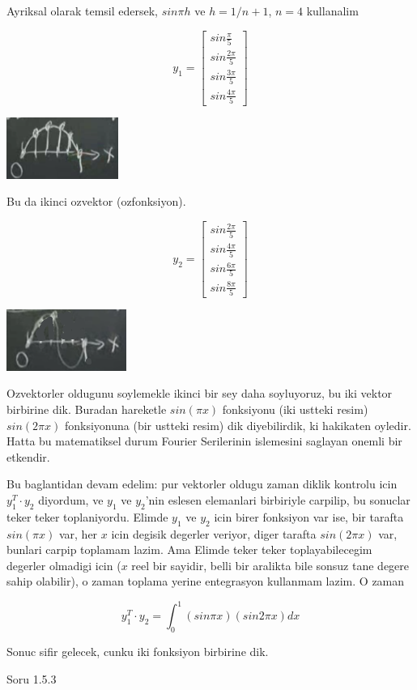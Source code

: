 \documentclass[12pt,fleqn]{article}\usepackage{../common}
\begin{document}
Ayriksal olarak temsil edersek, $sin\pi h$ ve $h = 1 / n+1$, $n = 4$
kullanalim

\[ 
y_1 = 
\left[\begin{array}{c}
sin \frac{\pi}{5} \\
sin \frac{2\pi}{5} \\
sin \frac{3\pi}{5} \\
sin \frac{4\pi}{5} 
\end{array}\right]
 \]


\includegraphics[height=2cm]{6_2.png}

Bu da ikinci ozvektor (ozfonksiyon). 

\[ 
y_2 = 
\left[\begin{array}{c}
sin \frac{2\pi}{5} \\
sin \frac{4\pi}{5} \\
sin \frac{6\pi}{5} \\
sin \frac{8\pi}{5} 
\end{array}\right]
 \]

\includegraphics[height=2cm]{6_3.png}

Ozvektorler oldugunu soylemekle ikinci bir sey daha soyluyoruz, bu iki
vektor birbirine dik. Buradan hareketle $sin(\pi x)$ fonksiyonu (iki
ustteki resim) $sin(2\pi x)$ fonksiyonuna (bir ustteki resim) dik
diyebilirdik, ki hakikaten oyledir. Hatta bu matematiksel durum Fourier
Serilerinin islemesini saglayan onemli bir etkendir.

Bu baglantidan devam edelim: pur vektorler oldugu zaman diklik kontrolu icin
$y_1^T \cdot y_2$ diyordum, ve $y_1$ ve $y_2$'nin eslesen elemanlari birbiriyle 
carpilip, bu sonuclar teker teker toplaniyordu. Elimde $y_1$ ve $y_2$ icin 
birer fonksiyon var ise, bir tarafta $sin(\pi x)$ var, her $x$ icin degisik
degerler veriyor, diger tarafta $sin(2\pi x)$ var, bunlari carpip toplamam
lazim. Ama Elimde teker teker toplayabilecegim degerler olmadigi icin ($x$ reel
bir sayidir, belli bir aralikta bile sonsuz tane degere sahip olabilir), o
zaman toplama yerine entegrasyon kullanmam lazim. O zaman

\[ y_1^T \cdot y_2  = \int_0^1 (sin \pi x)(sin 2\pi x)dx  \]

Sonuc sifir gelecek, cunku iki fonksiyon birbirine dik.

Soru 1.5.3


\end{document}
